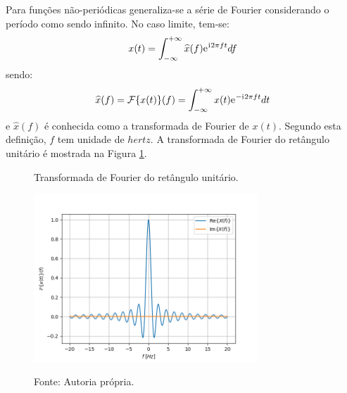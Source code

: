 \documentclass[12pt,a4paper]{report}
\newcommand{\I}{{\mathrm{i}\mkern1mu}}
\newcommand{\euler}{{\mathrm{e}\mkern1mu}}
\begin{document}
  Para funções não-periódicas generaliza-se a série de Fourier considerando o período como sendo infinito.
  No caso limite, tem-se:
  \begin{equation}
    x(t) = \int_{-\infty}^{+\infty} \widehat{x}(f) \euler^{\I 2 \pi f t} df
  \end{equation}
  sendo:
  \begin{equation}
    \widehat{x}(f) = \mathcal{F}\{x(t)\}(f) = \int_{-\infty}^{+\infty} x(t) \euler^{-\I 2 \pi f t} dt
  \end{equation}
  e $\widehat{x}(f)$ é conhecida como a transformada de Fourier de $x(t)$. Segundo esta definição, $f$ tem
  unidade de $hertz$. A transformada de Fourier do retângulo unitário é mostrada na Figura
  \ref{fig:fourier_transform}.
  \begin{figure}[H]
    \caption{Transformada de Fourier do retângulo unitário.}
    \centering
    \includegraphics[width=0.75\textwidth]{fourier_transform}
    \label{fig:fourier_transform}
    \caption*{Fonte: Autoria própria.}
  \end{figure}
\end{document}
